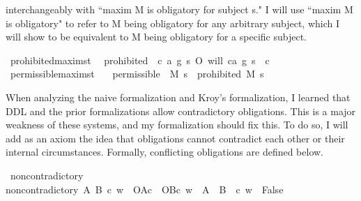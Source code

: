 \begin{isabellebody}
\begin{isamarkuptext}
{interchangeably with ``maxim M is obligatory for subject s." I will use ``maxim M is obligatory" to 
refer to M being obligatory for any arbitrary subject, which I will show to be equivalent to M being 
obligatory for a specific subject.}%
\end{isamarkuptext}\isamarkuptrue%
\isamarkupfalse%
\ prohibited{\isacharcolon}{\isacharcolon}{\isachardoublequoteopen}maxim{\isasymRightarrow}s{\isasymRightarrow}t{\isachardoublequoteclose}\ \ \isanewline
{\isachardoublequoteopen}prohibited\ {\isasymequiv}\ {\isasymlambda}{\isacharparenleft}c{\isacharcomma}\ a{\isacharcomma}\ g{\isacharparenright}\ s{\isachardot}\ O{\isacharbraceleft}\isactrlbold {\isasymnot}\ {\isacharparenleft}will\ {\isacharparenleft}c{\isacharcomma}a{\isacharcomma}\ g{\isacharparenright}\ s{\isacharparenright}\ {\isacharbar}\ c{\isacharbraceright}{\isachardoublequoteclose}\isanewline
\isanewline
{}\isamarkupfalse%
\ permissible{\isacharcolon}{\isacharcolon}{\isachardoublequoteopen}maxim{\isasymRightarrow}s{\isasymRightarrow}t{\isachardoublequoteclose}\isanewline
\ \ \ {\isachardoublequoteopen}permissible\ {\isasymequiv}\ {\isasymlambda}M\ s{\isachardot}\ \isactrlbold {\isasymnot}\ {\isacharparenleft}prohibited\ M\ s{\isacharparenright}{\isachardoublequoteclose}\isanewline
%
%
\begin{isamarkuptext}%
When analyzing the naive formalization and Kroy's formalization, I learned that DDL and the prior 
formalizations allow contradictory obligations. This is a major weakness of these systems, and my 
formalization should fix this. To do so, I will add as an axiom the idea that obligations cannot 
contradict each other or their internal circumstances. Formally, conflicting obligations are defined below.%
\end{isamarkuptext}\isamarkuptrue%
\isamarkupfalse%
\ non{\isacharunderscore}contradictory\ \ \isanewline
{\isachardoublequoteopen}non{\isacharunderscore}contradictory\ A\ B\ c\ w\ {\isasymequiv}\ {\isacharparenleft}{\isacharparenleft}O{\isacharbraceleft}A{\isacharbar}c{\isacharbraceright}\ \isactrlbold {\isasymand}\ O{\isacharbraceleft}B{\isacharbar}c{\isacharbraceright}{\isacharparenright}\ w{\isacharparenright}\ {\isasymlongrightarrow}\ {\isasymnot}{\isacharparenleft}{\isacharparenleft}A\ \isactrlbold {\isasymand}\ {\isacharparenleft}B\ \isactrlbold {\isasymand}\ c{\isacharparenright}{\isacharparenright}\ w\ {\isasymlongrightarrow}\ False{\isacharparenright}{\isachardoublequoteclose}\isanewline

\end{isabellebody}
